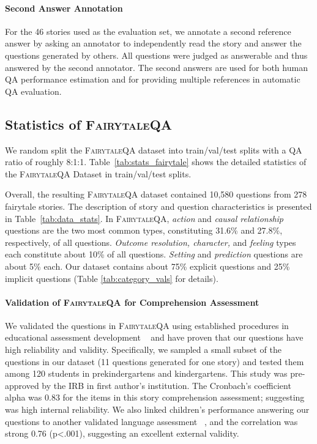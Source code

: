\documentclass[11pt]{article}
\newcommand{\datasetname}{\textsc{FairytaleQA}\xspace}
\begin{document}
\paragraph{Second Answer Annotation}
For the 46 stories used as the evaluation set, we annotate a second reference answer by asking an annotator to independently read the story and answer the questions generated by others. All questions were judged as answerable and thus answered by the second annotator.
The second answers are used for both human QA performance estimation and for providing multiple references in automatic QA evaluation.

\subsection{Statistics of \datasetname }

We random split the \datasetname dataset into train/val/test splits with a QA ratio of roughly 8:1:1. Table~\ref{tab:stats_fairytale} shows the detailed statistics of the \datasetname Dataset in train/val/test splits.

Overall, the resulting \datasetname dataset contained 10,580 questions from 278 fairytale stories. The description of story and question characteristics is presented in Table~\ref{tab:data_stats}. In \datasetname, \textit{action} and \textit{causal relationship} questions are the two most common types, constituting 31.6\% and 27.8\%, respectively, of all questions.\textit{ Outcome resolution, character,} and \textit{feeling} types each constitute about 10\% of all questions. \textit{Setting} and \textit{prediction} questions are about 5\% each. Our dataset contains about 75\% explicit questions and 25\% implicit questions (Table \ref{tab:category_vals} for details). 

\paragraph{Validation of \datasetname for Comprehension Assessment}
We validated the questions in \datasetname using established procedures in educational assessment development ~\cite{ozdemir2019development} and have proven that our questions have high reliability and validity. Specifically, we sampled a small subset of the questions in our dataset (11 questions generated for one story) and tested them among 120 students in prekindergartens and kindergartens. This study was pre-approved by the IRB in first author's institution. The Cronbach's coefficient alpha was 0.83 for the items in this story comprehension assessment; suggesting was high internal reliability. We also linked children's performance answering our questions to another validated language assessment ~\cite{martin2011expressive}, and the correlation was strong 0.76 (p<.001), suggesting an excellent external validity. 
\end{document}
